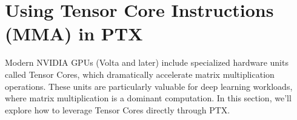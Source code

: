 \section{Using Tensor Core Instructions (MMA) in PTX}

Modern NVIDIA GPUs (Volta and later) include specialized hardware units called Tensor Cores, which dramatically accelerate matrix multiplication operations. These units are particularly valuable for deep learning workloads, where matrix multiplication is a dominant computation. In this section, we'll explore how to leverage Tensor Cores directly through PTX.

